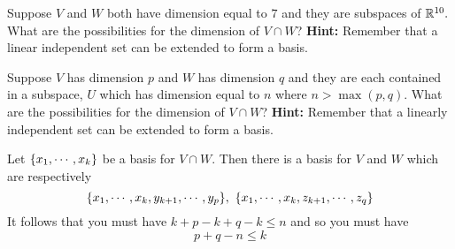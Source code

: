 \begin{enumialphparenastyle}
\begin{ex} Suppose $V$ and $W$ both have dimension equal to $7$ and they are
subspaces of $\mathbb{R}^{10}.$ What are the possibilities for the dimension
of $V\cap W$? \textbf{Hint: }Remember that a linear independent set can be
extended to form a basis. \vspace{1mm}
\end{ex}

\begin{ex} Suppose $V$ has dimension $p$ and $W$ has dimension $q$ and they
are each contained in a subspace, $U$ which has dimension equal to $n$ where 
$n>\max \left( p,q\right) .$ What are the possibilities for the dimension of 
$V\cap W$? \textbf{Hint: }Remember that a linearly independent set can be
extended to form a basis. \vspace{1mm}
\begin{sol}
Let $\{x_{1},\cdots ,x_{k}\} $ be a
basis for $V\cap W.$ Then there is a basis for $V$ and $W$ which are
respectively
\[
\{x_{1},\cdots ,x_{k},y_{k+1},\cdots ,y_{p}\} ,\ \{
x_{1},\cdots ,x_{k},z_{k+1},\cdots ,z_{q}\}
\]
It follows that you must have $k+p-k+q-k\leq n$ and so you must have
\[
p+q-n\leq k
\]
\end{sol}
\end{ex}


\end{enumialphparenastyle}
